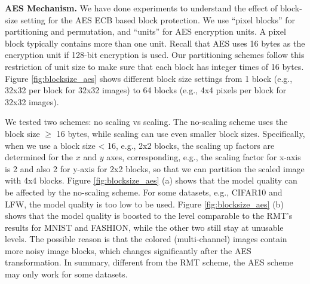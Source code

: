 \documentclass[conference]{IEEEtran}
\begin{document}
\textbf{AES Mechanism.} We have done experiments to understand the effect of block-size setting for the AES ECB based block protection. We use ``pixel blocks'' for partitioning and permutation, and ``units'' for AES encryption units. A pixel block typically contains more than one unit. Recall that AES uses 16 bytes as the encryption unit if 128-bit encryption is used. Our partitioning schemes follow this restriction of unit size to make sure that each block has integer times of 16 bytes. Figure \ref{fig:blocksize_aes} shows different block size settings from 1 block (e.g., 32x32 per block for 32x32 images) to 64 blocks (e.g., 4x4 pixels per block for 32x32 images). %


We tested two schemes: no scaling vs scaling. The no-scaling scheme uses the block size $\geq$ 16 bytes, while scaling can use even smaller block sizes. Specifically, when we use a block size < 16, e.g., 2x2 blocks, the scaling up factors are determined for the $x$ and $y$ axes, corresponding, e.g., the scaling factor for x-axis is 2 and also 2 for y-axis for 2x2 blocks, so that we can partition the scaled image with 4x4 blocks. Figure \ref{fig:blocksize_aes} (a) shows that the model quality can be affected by the no-scaling scheme. For some datasets, e.g., CIFAR10 and LFW, the model quality is too low to be used. Figure \ref{fig:blocksize_aes} (b)  shows that the model quality is boosted to the level comparable to the RMT's results for MNIST and FASHION, while the other two still stay at unusable levels. The possible reason is that the colored (multi-channel) images contain more noisy image blocks, which changes significantly after the AES transformation. In summary, different from the RMT scheme, the AES scheme may only work for some datasets.
\end{document}
